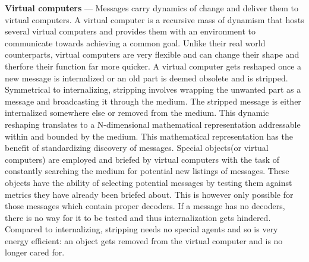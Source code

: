 \documentclass[a4paper, 10pt]{article}
\begin{document}
\textbf{Virtual computers} --- Messages carry dynamics of change and deliver them to virtual computers. A virtual computer is a recursive mass of dynamism that hosts several virtual computers and provides them with an environment to communicate towards achieving a common goal. Unlike their real world counterparts, virtual computers are very flexible and can change their shape and therfore their function far more quicker. A virtual computer gets reshaped once a new message is internalized or an old part is deemed obsolete and is stripped. Symmetrical to internalizing, stripping involves wrapping the unwanted part as a message and broadcasting it through the medium. The stripped message is either internalized somewhere else or removed from the medium. This dynamic reshaping translates to a N-dimensional mathematical representation addressable within and bounded by the medium. This mathematical representation has the benefit of standardizing discovery of messages. Special objects(or virtual computers) are employed and briefed by virtual computers with the task of constantly searching the medium for potential new listings of messages. These objects have the ability of selecting potential messages by testing them against metrics they have already been briefed about. This is however only possible for those messages which contain proper decoders. If a message has no decoders, there is no way for it to be tested and thus internalization gets hindered. Compared to internalizing, stripping needs no special agents and so is very energy efficient: an object gets removed from the virtual computer and is no longer cared for. 
\par
\end{document}
